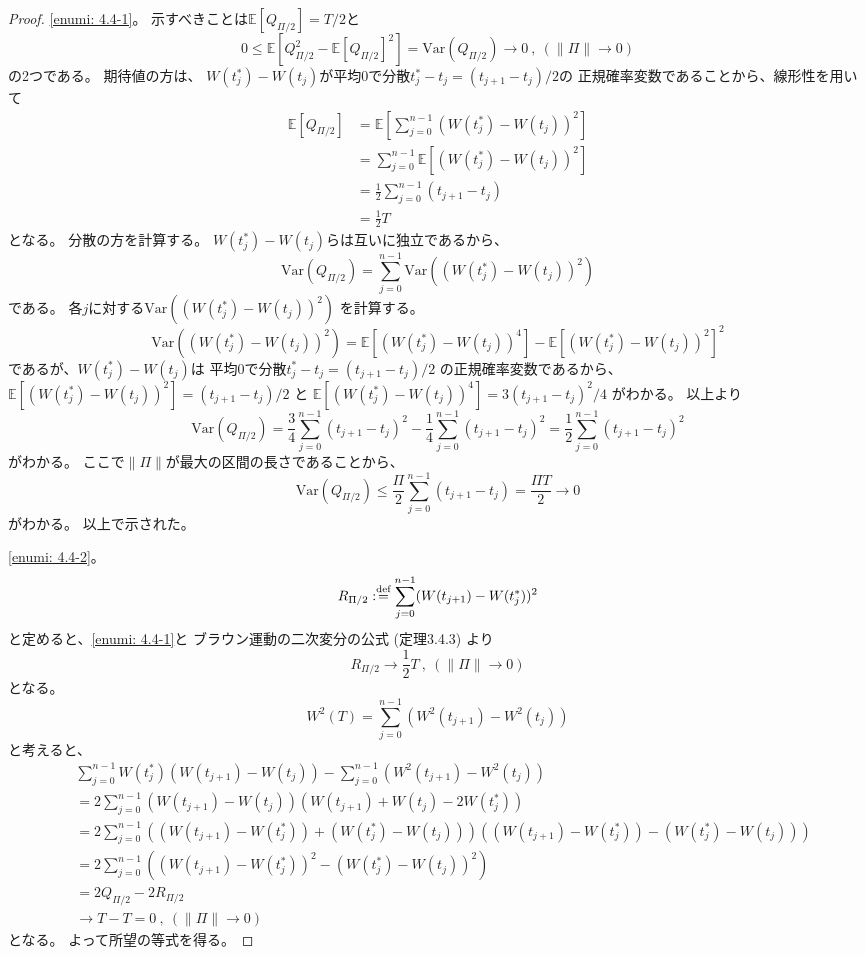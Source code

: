 \documentclass[uplatex]{jsarticle}
\theoremstyle{definition}
\def\E{\mathbb{E}}
\def\dfn{:\overset{\mbox{{\scriptsize def}}}{=}}
\newcommand{\Var}{\mathrm{Var}}
\begin{document}
\begin{proof}
  \ref{enumi: 4.4-1}。
  示すべきことは\(\E[Q_{\Pi/2}] = T/2\)と
  \[
  0 \leq \E[Q_{\Pi/2}^2 - \E[Q_{\Pi/2}]^2] = \Var(Q_{\Pi/2}) \to 0
  \ , \ (\|\Pi\| \to 0)
  \]
  の2つである。
  期待値の方は、
  \(W(t_j^*) - W(t_j)\)が平均\(0\)で分散\(t_j^*-t_j = (t_{j+1}-t_j)/2\)の
  正規確率変数であることから、線形性を用いて
  \begin{align*}
    \E[Q_{\Pi/2}]
    &= \E\left[ \sum_{j=0}^{n-1}(W(t_j^*) - W(t_j))^2 \right] \\
    &= \sum_{j=0}^{n-1}\E\left[ (W(t_j^*) - W(t_j))^2 \right] \\
    &= \frac{1}{2}\sum_{j=0}^{n-1}(t_{j+1}-t_j) \\
    &= \frac{1}{2}T
  \end{align*}
  となる。
  分散の方を計算する。
  \(W(t_j^*)-W(t_j)\)らは互いに独立であるから、
  \[
  \Var(Q_{\Pi/2})
  = \sum_{j=0}^{n-1}\Var\left(\left(W(t_j^*)-W(t_j)\right)^2 \right)
  \]
  である。
  各\(j\)に対する\(\Var\left(\left(W(t_j^*)-W(t_j)\right)^2 \right)\)
  を計算する。
  \[
  \Var\left(\left(W(t_j^*)-W(t_j)\right)^2 \right)
  = \E\left[ \left(W(t_j^*)-W(t_j)\right)^4 \right]
  -\E\left[ \left(W(t_j^*)-W(t_j)\right)^2 \right]^2
  \]
  であるが、\(W(t_j^*)-W(t_j)\)は
  平均\(0\)で分散\(t_j^*-t_j = (t_{j+1}-t_j)/2\)
  の正規確率変数であるから、
  \(\E\left[ \left(W(t_j^*)-W(t_j)\right)^2 \right] = (t_{j+1}-t_j)/2\)
  と
  \(\E\left[ \left(W(t_j^*)-W(t_j)\right)^4 \right] = 3(t_{j+1}-t_j)^2/4\)
  がわかる。
  以上より
  \[
  \Var(Q_{\Pi/2})
  = \frac{3}{4}\sum_{j=0}^{n-1} (t_{j+1}-t_j)^2
  - \frac{1}{4}\sum_{j=0}^{n-1} (t_{j+1}-t_j)^2
  = \frac{1}{2}\sum_{j=0}^{n-1} (t_{j+1}-t_j)^2
  \]
  がわかる。
  ここで\(\|\Pi\|\)が最大の区間の長さであることから、
  \[
  \Var(Q_{\Pi/2})
  \leq \frac{\Pi}{2}\sum_{j=0}^{n-1} (t_{j+1}-t_j) = \frac{\Pi T}{2}
  \to 0
  \]
  がわかる。
  以上で示された。

  \ref{enumi: 4.4-2}。
  \[
  R_{\Pi/2} \dfn \sum_{j=0}^{n-1}(W(t_{j+1}) - W(t_j^*))^2
  \]
  と定めると、\ref{enumi: 4.4-1}と
  ブラウン運動の二次変分の公式 (定理3.4.3) より
  \[R_{\Pi/2} \to \frac{1}{2}T \ , \ (\|\Pi\| \to 0)\]
  となる。
  \[
  W^2(T) = \sum_{j=0}^{n-1}\left( W^2(t_{j+1}) - W^2(t_j) \right)
  \]
  と考えると、
  \begin{align*}
    &\sum_{j=0}^{n-1}W(t_j^*)\left( W(t_{j+1}) - W(t_j)\right)
    - \sum_{j=0}^{n-1}\left( W^2(t_{j+1}) - W^2(t_j) \right) \\
    &= 2\sum_{j=0}^{n-1}\left( W(t_{j+1}) - W(t_j)\right)
    \left( W(t_{j+1}) + W(t_j) - 2W(t_j^*)\right) \\
    &= 2\sum_{j=0}^{n-1}
    \left( \left( W(t_{j+1}) - W(t_j^*) \right)
    + \left( W(t_j^*) - W(t_j)\right)\right)
    \left(\left( W(t_{j+1}) - W(t_j^*)\right)
    - \left(W(t_j^*) - W(t_j)\right) \right) \\
    &= 2\sum_{j=0}^{n-1}
    \left( \left( W(t_{j+1}) - W(t_j^*) \right) ^2
    - \left( W(t_j^*) - W(t_j)\right)^2\right) \\
    &= 2Q_{\Pi/2} - 2R_{\Pi/2} \\
    &\to T - T = 0 \ , \ (\|\Pi\| \to 0)
  \end{align*}
  となる。
  よって所望の等式を得る。
\end{proof}
\end{document}
